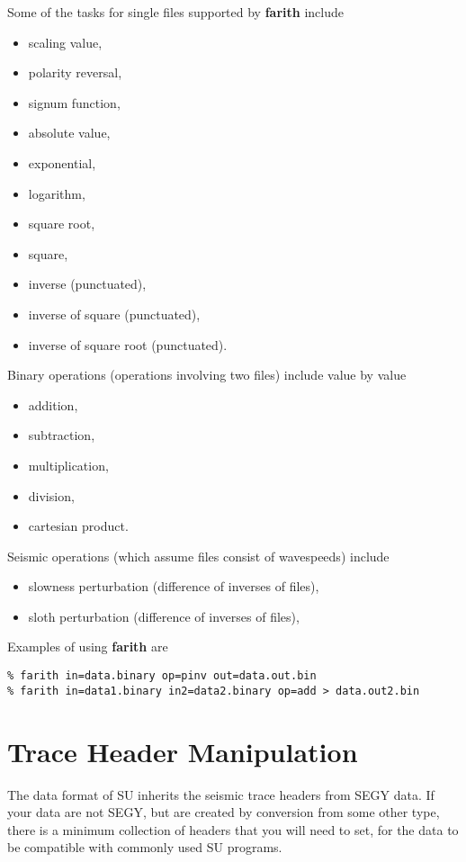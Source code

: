 {{{Some of the tasks for single files supported by {\bf farith\/} include
\begin{itemize}
\item scaling value,
\item polarity reversal,
\item signum function,
\item absolute value,
\item exponential,
\item logarithm,
\item square root,
\item square,
\item inverse (punctuated),
\item inverse of square (punctuated),
\item inverse of square root (punctuated).
\end{itemize}
Binary operations (operations involving two files) include
value by value
\begin{itemize}
\item addition,
\item subtraction,
\item multiplication,
\item division,
\item cartesian product.
\end{itemize}
Seismic operations (which assume files consist of wavespeeds) include
\begin{itemize}
\item slowness perturbation (difference of inverses of files),
\item sloth perturbation (difference of inverses of files),
\end{itemize}
Examples of using {\bf farith\/} are
{\small \begin{verbatim}
% farith in=data.binary op=pinv out=data.out.bin
% farith in=data1.binary in2=data2.binary op=add > data.out2.bin
\end{verbatim}} \noindent


\section{Trace Header Manipulation}

The data format of SU inherits the seismic trace headers
from SEGY data. If your data are not SEGY, but are created
by conversion from some other type, there is a minimum collection
of headers that you will need to set, for the data to be compatible
with commonly used SU programs.

}}}
